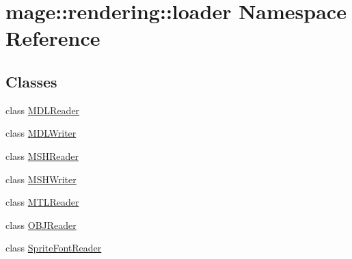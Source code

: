 \hypertarget{namespacemage_1_1rendering_1_1loader}{}\section{mage\+:\+:rendering\+:\+:loader Namespace Reference}
\label{namespacemage_1_1rendering_1_1loader}
\subsection*{Classes}
\begin{DoxyCompactItemize}
\item 
class \hyperlink{classmage_1_1rendering_1_1loader_1_1_m_d_l_reader}{M\+D\+L\+Reader}
\item 
class \hyperlink{classmage_1_1rendering_1_1loader_1_1_m_d_l_writer}{M\+D\+L\+Writer}
\item 
class \hyperlink{classmage_1_1rendering_1_1loader_1_1_m_s_h_reader}{M\+S\+H\+Reader}
\item 
class \hyperlink{classmage_1_1rendering_1_1loader_1_1_m_s_h_writer}{M\+S\+H\+Writer}
\item 
class \hyperlink{classmage_1_1rendering_1_1loader_1_1_m_t_l_reader}{M\+T\+L\+Reader}
\item 
class \hyperlink{classmage_1_1rendering_1_1loader_1_1_o_b_j_reader}{O\+B\+J\+Reader}
\item 
class \hyperlink{classmage_1_1rendering_1_1loader_1_1_sprite_font_reader}{Sprite\+Font\+Reader}
\end{DoxyCompactItemize}
